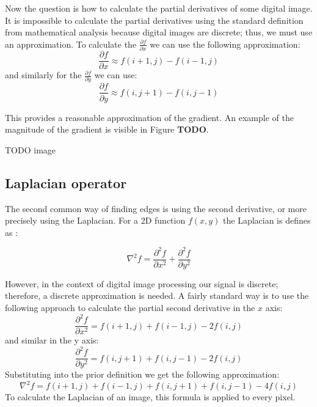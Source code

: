 \documentclass[
  digital,     %
  oneside,     %
  nosansbold,  %
  nocolorbold, %
  lof,         %
  lot,         %
]{fithesis4}
\begin{document}
Now the question is how to calculate the partial derivatives of some digital image.
It is impossible to calculate the partial derivatives using the standard
definition from mathematical analysis because digital images are discrete; thus,
we must use an approximation. To calculate the $\frac{\partial f}{\partial x}$
we can use the following approximation:
$$\frac{\partial f}{\partial x} \approx f(i+1,j)-f(i-1,j)$$
and similarly for the $\frac{\partial f}{\partial y}$ we can use:
$$\frac{\partial f}{\partial y} \approx f(i, j+1)-f(i,j-1)$$

This provides a reasonable approximation of the gradient. An example of the
magnitude of the gradient is visible in Figure \textbf{TODO}.

TODO image

\subsection{Laplacian operator}

The second common way of finding edges is using the second derivative, or more
precisely using the Laplacian. For a 2D function $f(x, y)$ the Laplacian is
defines as \cite{gonzalez2002}:

$$\nabla^2 f = \frac{\partial^2 f}{\partial x^2} + \frac{\partial^2 f}{\partial y^2}$$

However, in the context of digital image processing our signal is discrete;
therefore, a discrete approximation is needed. A fairly standard way is to use
the following approach to calculate the partial second derivative in the $x$
axis:
$$\frac{\partial^2 f}{\partial x^2} = f(i + 1, j) + f(i - 1, j) - 2f(i, j)$$
and similar in the y axis:
$$\frac{\partial^2 f}{\partial y^2} = f(i, j + 1) + f(i, j - 1) - 2f(i, j)$$
Substituting into the prior definition we get the following approximation:
$$\nabla^2 f = f(i+1, j) + f(i-1, j) + f(i, j+1) + f(i, j-1) - 4f(i,j)$$
To calculate the Laplacian of an image, this formula is applied to every pixel.

\end{document}
